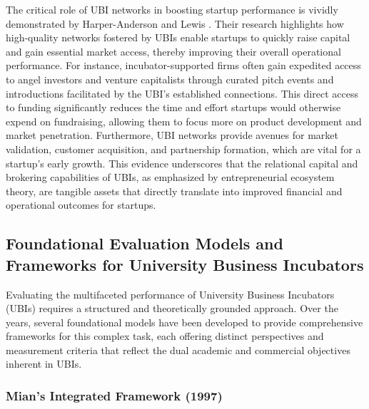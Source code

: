 \documentclass[../Main.tex]{subfiles}
\begin{document}
The critical role of UBI networks in boosting startup performance is vividly demonstrated by Harper-Anderson and Lewis \cite{harper2018makes}. Their research highlights how high-quality networks fostered by UBIs enable startups to quickly raise capital and gain essential market access, thereby improving their overall operational performance. For instance, incubator-supported firms often gain expedited access to angel investors and venture capitalists through curated pitch events and introductions facilitated by the UBI's established connections. This direct access to funding significantly reduces the time and effort startups would otherwise expend on fundraising, allowing them to focus more on product development and market penetration. Furthermore, UBI networks provide avenues for market validation, customer acquisition, and partnership formation, which are vital for a startup's early growth. This evidence underscores that the relational capital and brokering capabilities of UBIs, as emphasized by entrepreneurial ecosystem theory, are tangible assets that directly translate into improved financial and operational outcomes for startups.

\subsection{Foundational Evaluation Models and Frameworks for University Business Incubators}

Evaluating the multifaceted performance of University Business Incubators (UBIs) requires a structured and theoretically grounded approach. Over the years, several foundational models have been developed to provide comprehensive frameworks for this complex task, each offering distinct perspectives and measurement criteria that reflect the dual academic and commercial objectives inherent in UBIs.

\subsubsection{Mian's Integrated Framework (1997)}
\end{document}
